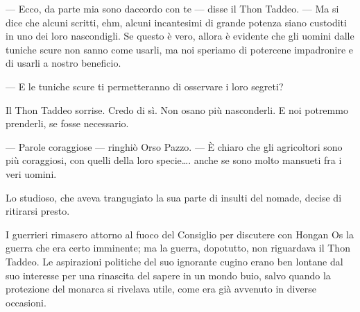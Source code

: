--- Ecco, da parte mia sono d\textquotesingle accordo con te --- disse
il Thon Taddeo. --- Ma si dice che alcuni scritti, ehm, alcuni
incantesimi di grande potenza siano custoditi in uno dei loro
nascondigli. Se questo è vero, allora è evidente che gli uomini dalle
tuniche scure non sanno come usarli, ma noi speriamo di potercene
impadronire e di usarli a nostro beneficio.

--- E le tuniche scure ti permetteranno di osservare i loro segreti?

Il Thon Taddeo sorrise. Credo di sì. Non osano più nasconderli. E noi
potremmo prenderli, se fosse necessario.

--- Parole coraggiose --- ringhiò Orso Pazzo. --- È chiaro che gli
agricoltori sono più coraggiosi, con quelli della loro specie\ldots.
anche se sono molto mansueti fra i veri uomini.

Lo studioso, che aveva trangugiato la sua parte di insulti del nomade,
decise di ritirarsi presto.

I guerrieri rimasero attorno al fuoco del Consiglio per discutere con
Hongan Os la guerra che era certo imminente; ma la guerra, dopotutto,
non riguardava il Thon Taddeo. Le aspirazioni politiche del suo
ignorante cugino erano ben lontane dal suo interesse per una rinascita
del sapere in un mondo buio, salvo quando la protezione del monarca si
rivelava utile, come era già avvenuto in diverse occasioni.
